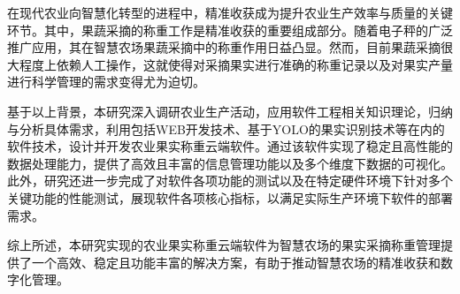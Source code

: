 
在现代农业向智慧化转型的进程中，精准收获成为提升农业生产效率与质量的关键环节。其中，果蔬采摘的称重工作是精准收获的重要组成部分。随着电子秤的广泛推广应用，其在智慧农场果蔬采摘中的称重作用日益凸显。然而，目前果蔬采摘很大程度上依赖人工操作，这就使得对采摘果实进行准确的称重记录以及对果实产量进行科学管理的需求变得尤为迫切。

基于以上背景，本研究深入调研农业生产活动，应用软件工程相关知识理论，归纳与分析具体需求，利用包括WEB开发技术、基于YOLO的果实识别技术等在内的软件技术，设计并开发农业果实称重云端软件。通过该软件实现了稳定且高性能的数据处理能力，提供了高效且丰富的信息管理功能以及多个维度下数据的可视化。此外，研究还进一步完成了对软件各项功能的测试以及在特定硬件环境下针对多个关键功能的性能测试，展现软件各项核心指标，以满足实际生产环境下软件的部署需求。

综上所述，本研究实现的农业果实称重云端软件为智慧农场的果实采摘称重管理提供了一个高效、稳定且功能丰富的解决方案，有助于推动智慧农场的精准收获和数字化管理。 